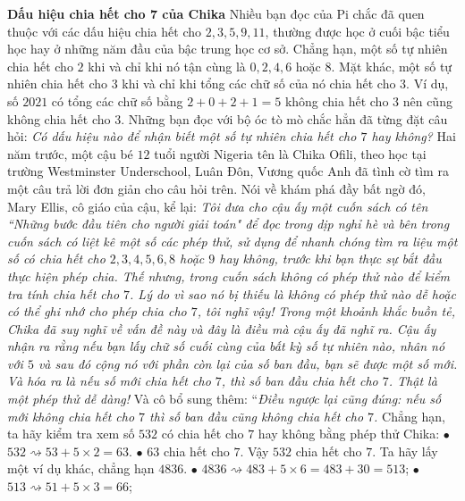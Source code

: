 \begin{multicols}{2}	
	\textbf{\color{quantoan}Dấu hiệu chia hết cho $\pmb{7}$ của Chika}
	\vskip 0.1cm
	Nhiều bạn đọc của Pi chắc đã quen thuộc với các dấu hiệu chia hết cho $2, 3, 5, 9, 11$, thường được học ở cuối bậc tiểu học hay ở những năm đầu của bậc trung học cơ sở. Chẳng hạn, một số tự nhiên chia hết cho $2$ khi và chỉ khi nó tận cùng là $0, 2, 4, 6$ hoặc $8$. Mặt khác, một số tự nhiên chia hết cho $3$ khi và chỉ khi tổng các chữ số của nó chia hết cho $3$. Ví dụ, số $2021$ có tổng các chữ số bằng $2+0+2+1=5$ không chia hết cho $3$ nên cũng không chia hết cho $3$. Những bạn đọc với bộ óc tò mò chắc hẳn đã từng đặt câu hỏi: \emph{Có dấu hiệu nào để nhận biết một số tự nhiên chia hết cho $7$ hay không?} 
	\vskip 0.1cm
	Hai năm trước, một cậu bé $12$ tuổi người Nigeria tên là Chika Ofili, theo học tại trường Westminster Underschool, Luân Đôn, Vương quốc Anh đã tình cờ tìm ra một câu trả lời đơn giản cho câu hỏi trên. Nói về  khám phá đầy bất ngờ đó, Mary Ellis, cô giáo của cậu, kể lại: 
	\vskip 0.1cm
	\emph{Tôi đưa cho cậu ấy một cuốn sách có tên ``Những bước đầu tiên cho người giải toán" để đọc trong dịp nghỉ hè và bên trong cuốn sách có liệt kê một số các phép thử, sử dụng để \linebreak nhanh chóng tìm ra liệu một số có chia hết cho $2, 3, 4, 5, 6, 8$ hoặc $9$ hay không, trước khi bạn thực sự bắt đầu thực hiện phép chia. Thế nhưng, trong cuốn sách không có phép thử nào để kiểm tra tính chia hết cho $7$. Lý do vì sao nó bị thiếu là không có phép thử nào dễ hoặc có thể ghi nhớ cho phép chia cho $7$, tôi nghĩ vậy!}
	\vskip 0.1cm
	\emph{Trong một khoảnh khắc buồn tẻ, Chika đã suy nghĩ về vấn đề này và đây là điều mà cậu ấy đã nghĩ ra. Cậu ấy nhận ra rằng nếu bạn lấy chữ số cuối cùng của bất kỳ số tự nhiên nào, nhân nó với $5$ và sau đó cộng nó với phần còn lại của số ban đầu, bạn sẽ được một số mới. Và hóa ra là nếu số mới chia hết cho $7$, thì số ban đầu chia hết cho $7$. Thật là một phép thử dễ dàng!}
	\vskip 0.1cm
	Và cô bổ sung thêm: ``\emph{Điều ngược lại cũng đúng: nếu số mới không chia hết cho $7$ thì số ban đầu cũng không chia hết cho $7$.}
	\vskip 0.1cm
	Chẳng hạn, ta hãy kiểm tra xem số $532$ có chia hết cho $7$ hay không bằng phép thử Chika:
	\vskip 0.1cm
	$\bullet$ $532 \rightsquigarrow 53+ 5 \times 2=63$.
	\vskip 0.1cm
	$\bullet$ $63$ chia hết cho $7$. Vậy $532$ chia hết cho $7$.
	\vskip 0.1cm
	Ta hãy lấy một ví dụ khác, chẳng hạn $4836$.
	\vskip 0.1cm
	$\bullet$ $4836 \rightsquigarrow 483+ 5 \times 6=483 + 30= 513$;
	\vskip 0.1cm
	$\bullet$ $513 \rightsquigarrow  51 + 5 \times 3= 66$;

\end{multicols}
